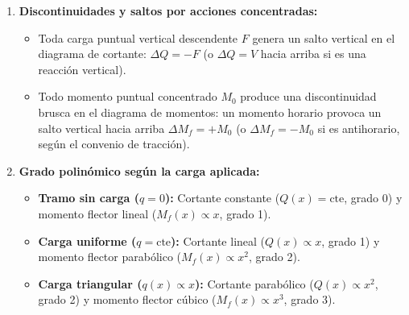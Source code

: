 {\begin{enumerate}
\begin{itemize}
                  \item El sentido de la flecha del extremo exterior (por ejemplo, en el extremo izquierdo $x = 0$, la flecha izquierda del convenio) debe coincidir físicamente en sentido y magnitud con la reacción vertical del Diagrama de Cuerpo Libre (DCL).

                  \item Si en un extremo actúa un momento concentrado puntual $M_0$ (por ejemplo, $8\text{ kN}\cdot\text{m}$), el diagrama de momento flector debe cerrar exactamente en dicho valor $M_0$.

              \end{itemize}



        \item \textbf{Discontinuidades y saltos por acciones concentradas:}

              \begin{itemize}

                  \item Toda carga puntual vertical descendente $F$ genera un salto vertical en el diagrama de cortante: $\Delta Q = -F$ (o $\Delta Q = V$ hacia arriba si es una reacción vertical).

                  \item Todo momento puntual concentrado $M_0$ produce una discontinuidad brusca en el diagrama de momentos: un momento horario provoca un salto vertical hacia arriba $\Delta M_f = +M_0$ (o $\Delta M_f = -M_0$ si es antihorario, según el convenio de tracción).

              \end{itemize}



        \item \textbf{Grado polinómico según la carga aplicada:}

              \begin{itemize}

                  \item \textbf{Tramo sin carga ($q = 0$):} Cortante constante ($Q(x) = \text{cte}$, grado 0) y momento flector lineal ($M_f(x) \propto x$, grado 1).

                  \item \textbf{Carga uniforme ($q = \text{cte}$):} Cortante lineal ($Q(x) \propto x$, grado 1) y momento flector parabólico ($M_f(x) \propto x^2$, grado 2).

                  \item \textbf{Carga triangular ($q(x) \propto x$):} Cortante parabólico ($Q(x) \propto x^2$, grado 2) y momento flector cúbico ($M_f(x) \propto x^3$, grado 3).

              \end{itemize}

    \end{enumerate}

}



